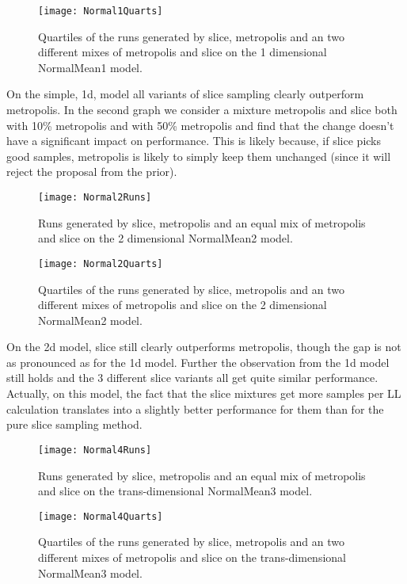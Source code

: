 \begin{figure}[H]
    \centering
    \texttt{[image: Normal1Quarts]}
    \caption{Quartiles of the runs generated by slice, metropolis and an two different mixes of metropolis and slice on the 1 dimensional NormalMean1 model.}
    \label{fig:Normal1Quarts}
\end{figure}

On the simple, 1d, model all variants of slice sampling clearly outperform metropolis. In the second graph we consider a mixture metropolis and slice both with 10\% metropolis and with 50\% metropolis and find that the change doesn't have a significant impact on performance.
This is likely because, if slice picks good samples, metropolis is likely to simply keep them unchanged (since it will reject the proposal from the prior).

\begin{figure}[H]
    \centering
    \texttt{[image: Normal2Runs]}
    \caption{Runs generated by slice, metropolis and an equal mix of metropolis and slice on the 2 dimensional NormalMean2 model.}
    \label{fig:Normal2Runs}
\end{figure}

\begin{figure}[H]
    \centering
    \texttt{[image: Normal2Quarts]}
    \caption{Quartiles of the runs generated by slice, metropolis and an two different mixes of metropolis and slice on the 2 dimensional NormalMean2 model.}
    \label{fig:Normal2Quarts}
\end{figure}

On the 2d model, slice still clearly outperforms metropolis, though the gap is not as pronounced as for the 1d model. Further the observation from the 1d model still holds and the 3 different slice variants all get quite similar performance. Actually, on this model, the fact that the slice mixtures get more samples per LL calculation translates into a slightly better performance for them than for the pure slice sampling method.

\begin{figure}[H]
    \centering
    \texttt{[image: Normal4Runs]}
    \caption{Runs generated by slice, metropolis and an equal mix of metropolis and slice on the trans-dimensional NormalMean3 model.}
    \label{fig:Normal4Runs}
\end{figure}

\begin{figure}[H]
    \centering
    \texttt{[image: Normal4Quarts]}
    \caption{Quartiles of the runs generated by slice, metropolis and an two different mixes of metropolis and slice on the trans-dimensional NormalMean3 model.}
    \label{fig:Normal4Quarts}
\end{figure}


